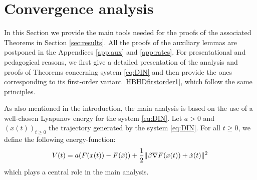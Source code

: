\documentclass[reqno]{amsart}
\theoremstyle{plain}
\theoremstyle{definition}
\theoremstyle{remark}
\DeclareMathOperator{\crit}{crit}	%
\DeclarePairedDelimiter{\norm}{\lVert}{\rVert}	%
\begin{document}
\section{Convergence analysis}
\label{sec:analysis}


In this Section we provide the main tools needed for the proofs of the associated Theorems in Section \ref{sec:results}. All the proofs of the auxiliary lemmas are postponed in the Appendices \ref{app:aux} and \ref{app:rates}. 
For presentational and pedagogical reasons, we first give a detailed presentation of the analysis and proofs of Theorems concerning system \eqref{eq:DIN} and then provide the ones corresponding to its first-order variant \eqref{HBHDfirstorder1}, which follow the same principles.

As also mentioned in the introduction, the main analysis is based on the use of a well-chosen Lyapunov energy for the system \eqref{eq:DIN}. Let $a>0$ and $\left(x(t)\right)_{t\geq 0}$ the trajectory generated by the system \eqref{eq:DIN}. For all $t\geq 0 $, we define the following energy-function:
\begin{equation}\label{Lyapunov def}
    V(t) = 
    a(F(x(t))-F(\bar{x})) + \frac{1}{2}\norm{\beta\nabla F(x(t))+\dot{x}(t)}^{2}
\end{equation}
which plays a central role in the main analysis.
\end{document}
